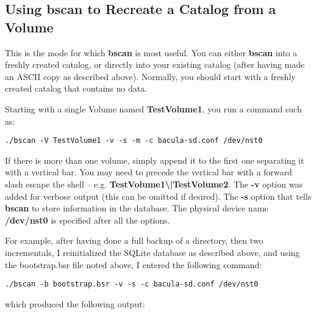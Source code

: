 \subsection{Using bscan to Recreate a Catalog from a Volume}

This is the mode for which {\bf bscan} is most useful. You can either {\bf
bscan} into a freshly created catalog, or directly into your existing catalog
(after having made an ASCII copy as described above). Normally, you should
start with a freshly created catalog that contains no data. 

Starting with a single Volume named {\bf TestVolume1}, you run a command such
as: 

\footnotesize
\begin{verbatim}
./bscan -V TestVolume1 -v -s -m -c bacula-sd.conf /dev/nst0
\end{verbatim}
\normalsize

If there is more than one volume, simply append it to the first one separating
it with a vertical bar. You may need to precede the vertical bar with a
forward slash escape the shell -- e.g. {\bf
TestVolume1\textbackslash{}|TestVolume2}. The {\bf -v} option was added for
verbose output (this can be omitted if desired). The {\bf -s} option that
tells {\bf bscan} to store information in the database. The physical device
name {\bf /dev/nst0} is specified after all the options. 

{\bf} For example, after having done a full backup of a directory, then two
incrementals, I reinitialized the SQLite database as described above, and
using the bootstrap.bsr file noted above, I entered the following command: 

\footnotesize
\begin{verbatim}
./bscan -b bootstrap.bsr -v -s -c bacula-sd.conf /dev/nst0
\end{verbatim}
\normalsize

which produced the following output: 

